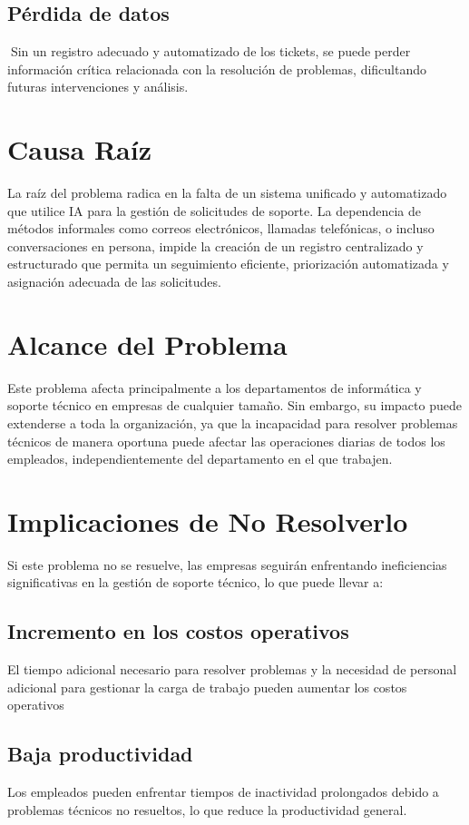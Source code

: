 \documentclass[a4paper,12pt]{article}
\begin{document}
\subsection{Pérdida de datos}
Sin un registro adecuado y automatizado de los tickets, se puede perder información crítica relacionada con la resolución de problemas, dificultando futuras intervenciones y análisis.


\section{Causa Raíz}
La raíz del problema radica en la falta de un sistema unificado y automatizado que utilice IA para la gestión de solicitudes de soporte. La dependencia de métodos informales como correos electrónicos, llamadas telefónicas, o incluso conversaciones en persona, impide la creación de un registro centralizado y estructurado que permita un seguimiento eficiente, priorización automatizada y asignación adecuada de las solicitudes.


\section{Alcance del Problema}
Este problema afecta principalmente a los departamentos de informática y soporte técnico en empresas de cualquier tamaño. Sin embargo, su impacto puede extenderse a toda la organización, ya que la incapacidad para resolver problemas técnicos de manera oportuna puede afectar las operaciones diarias de todos los empleados, independientemente del departamento en el que trabajen.

\section{Implicaciones de No Resolverlo}
Si este problema no se resuelve, las empresas seguirán enfrentando ineficiencias significativas en la gestión de soporte técnico, lo que puede llevar a:
\subsection{Incremento en los costos operativos}
El tiempo adicional necesario para resolver problemas y la necesidad de personal adicional para gestionar la carga de trabajo pueden aumentar los costos operativos

\subsection{Baja productividad}
Los empleados pueden enfrentar tiempos de inactividad prolongados debido a problemas técnicos no resueltos, lo que reduce la productividad general.
\end{document}
